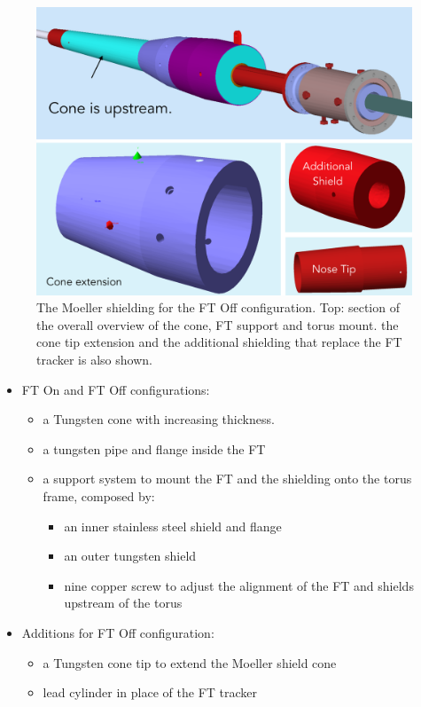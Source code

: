 \begin{figure}
	\centering
	\includegraphics[width=0.98\columnwidth,keepaspectratio]{img/moellerShieldingFTOff.png}
   \caption{The Moeller shielding for the FT Off configuration. Top: section of the overall overview of the cone, FT support and torus mount.
            the cone tip extension and the additional shielding that replace the FT tracker is also shown.}
	\label{fig:moellerShieldingFTOff}
\end{figure}



\begin{itemize}
	\item FT On and FT Off configurations:
	\begin{itemize}
		\item a Tungsten cone with increasing thickness.
		\item a tungsten pipe and flange inside the FT
		\item a support system to mount the FT and the shielding onto the torus frame, composed by:
		\begin{itemize}
			\item an inner stainless steel shield and flange
			\item an outer tungsten shield
			\item nine copper screw to adjust the alignment of the FT and shields upstream of the torus
		\end{itemize}
	\end{itemize}
	\item Additions for FT Off configuration:
	\begin{itemize}
	\item a Tungsten cone tip to extend the Moeller shield cone
	\item lead cylinder in place of the FT tracker
	\end{itemize}

\end{itemize}




